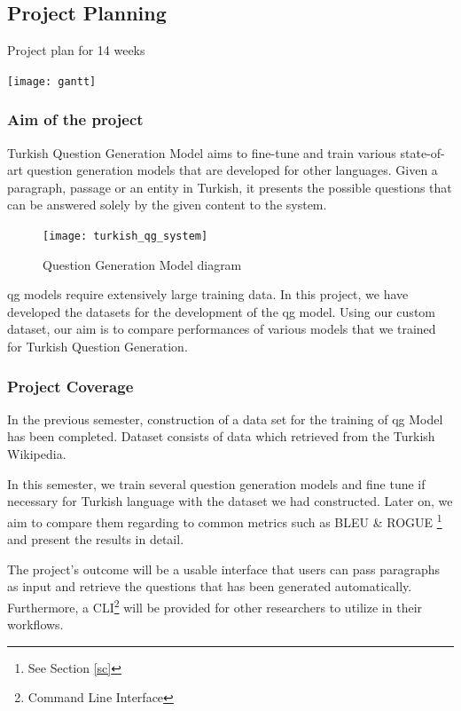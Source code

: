 \documentclass{mefsdp}
\begin{document}
	\subsection{Project Planning}
	\begin{table}[ht!]
		\caption{Project plan for 14 weeks}
		\centering
		\texttt{[image: gantt]}
	\end{table}
	\newpage
	\subsubsection{Aim of the project}
	Turkish Question Generation Model aims to fine-tune and train various state-of-art question generation models that are developed for other languages. Given a paragraph, passage or an entity in Turkish, it presents the possible questions that can be answered solely by the given content to the system.
	
	\begin{figure}[ht!]
		\centering
		\texttt{[image: turkish\_qg\_system]}
		\caption{Question Generation Model diagram}
	\end{figure}

	\gls{qg} models require extensively large training data. In this project, we have developed the  datasets for the development of the \gls{qg} model. Using our custom dataset, our aim is to compare performances of various models that we trained for Turkish Question Generation. 
	
	
	\subsubsection{Project Coverage}
	
	In the previous semester, construction of a data set for the training of \gls{qg} Model has been completed. Dataset consists of data which retrieved from the Turkish Wikipedia. \newline \par
	
	In this semester, we train several question generation models and fine tune if necessary for Turkish language with the dataset we had constructed. Later on, we aim to compare them regarding to common metrics such as BLEU \& ROGUE \footnote{See Section \ref{sc}} and present the results in detail. \newline \par
	
	The project's outcome will be a usable interface that users can pass paragraphs as input and retrieve the questions that has been generated automatically. Furthermore, a CLI\footnote{Command Line Interface} will be provided for other researchers to utilize in their workflows. 
	
\end{document}
